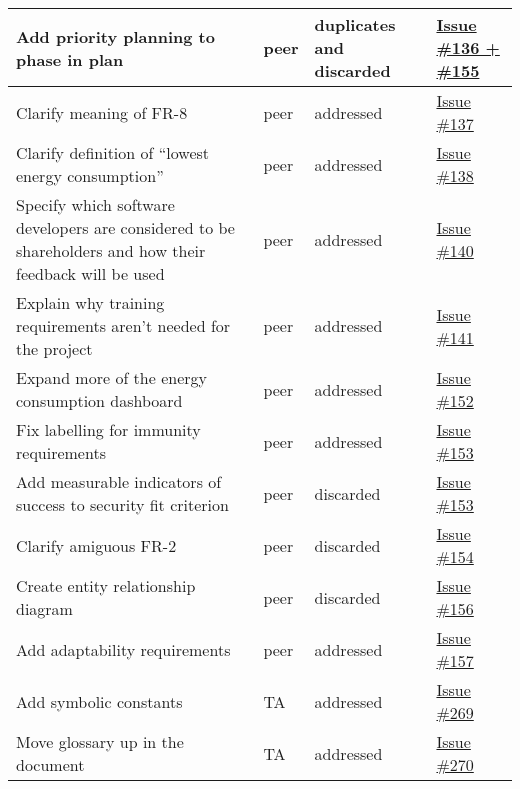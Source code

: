 \documentclass{article}
\begin{document}
\begin{longtable}[H]{|p{5cm}|p{2cm}|p{5cm}|p{3cm}|}
    Add priority planning to phase in plan & peer & duplicates and discarded & \href{https://github.com/ssm-lab/capstone--source-code-optimizer/issues/155}{Issue \#136 + \#155} \\ \hline
    Clarify meaning of FR-8 & peer & addressed & \href{https://github.com/ssm-lab/capstone--source-code-optimizer/issues/137}{Issue \#137} \\ \hline
    Clarify definition of ``lowest energy consumption'' & peer & addressed & \href{https://github.com/ssm-lab/capstone--source-code-optimizer/issues/138}{Issue \#138} \\ \hline
    Specify which software developers are considered to be shareholders and how their feedback will be used & peer & addressed & \href{https://github.com/ssm-lab/capstone--source-code-optimizer/issues/140}{Issue \#140} \\ \hline
    Explain why training requirements aren't needed for the project & peer & addressed & \href{https://github.com/ssm-lab/capstone--source-code-optimizer/issues/141}{Issue \#141} \\ \hline
    Expand more of the energy consumption dashboard & peer & addressed & \href{https://github.com/ssm-lab/capstone--source-code-optimizer/issues/152}{Issue \#152} \\ \hline
    Fix labelling for immunity requirements & peer & addressed & \href{https://github.com/ssm-lab/capstone--source-code-optimizer/issues/153}{Issue \#153} \\ \hline
    Add measurable indicators of success to security fit criterion & peer & discarded & \href{https://github.com/ssm-lab/capstone--source-code-optimizer/issues/153}{Issue \#153} \\ \hline
    Clarify amiguous FR-2 & peer & discarded & \href{https://github.com/ssm-lab/capstone--source-code-optimizer/issues/154}{Issue \#154} \\ \hline
    Create entity relationship diagram & peer & discarded & \href{https://github.com/ssm-lab/capstone--source-code-optimizer/issues/156}{Issue \#156} \\ \hline
    Add adaptability requirements & peer & addressed & \href{https://github.com/ssm-lab/capstone--source-code-optimizer/issues/157}{Issue \#157} \\ \hline
    Add symbolic constants & TA & addressed & \href{https://github.com/ssm-lab/capstone--source-code-optimizer/issues/269}{Issue \#269} \\ \hline
    Move glossary up in the document & TA & addressed & \href{https://github.com/ssm-lab/capstone--source-code-optimizer/issues/270}{Issue \#270} \\ \hline

\end{longtable}
\end{document}
